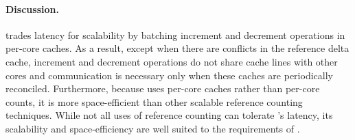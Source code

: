 \paragraph{Discussion.}
 trades latency for scalability by batching increment and
decrement operations in per-core caches.  As a result, except when
there are conflicts in the reference delta cache, increment and
decrement operations do not share cache lines with other cores and
communication is necessary only when these caches are periodically
reconciled.  Furthermore, because  uses per-core caches
rather than per-core counts, it is more space-efficient than other
scalable reference counting techniques.  While not all uses of
reference counting can tolerate 's latency, its scalability
and space-efficiency are well suited to the requirements of \vm.

